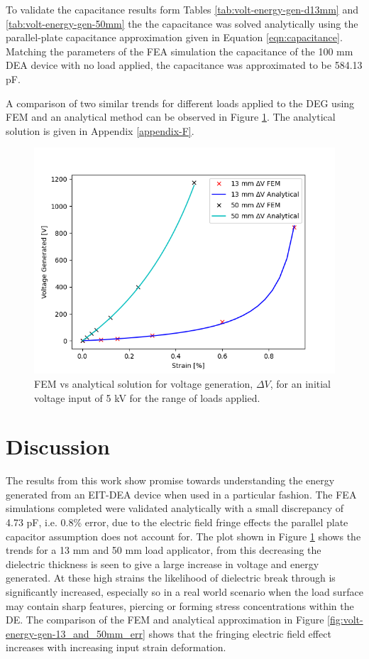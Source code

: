 To validate the capacitance results form Tables \ref{tab:volt-energy-gen-d13mm} and \ref{tab:volt-energy-gen-50mm} the the capacitance was solved analytically using the parallel-plate capacitance approximation given in Equation \ref{eqn:capacitance}. Matching the parameters of the FEA simulation the capacitance of the 100 mm DEA device with no load applied, the capacitance was approximated to be 584.13 pF.

A comparison of two similar trends for different loads applied to the DEG using FEM and an analytical method can be observed in Figure \ref{fig:volt-energy-gen-13_and_50mm}. The analytical solution is given in Appendix \ref{appendix-F}.

\begin{figure}[H]
	\centering
	\includegraphics[width=0.65\linewidth]{Figures/plot_DEG_strain_vs_Vgen_FEM_vs_analytical.png}
	\caption{FEM vs analytical solution for voltage generation, $\Delta V$, for an initial voltage input of 5 kV for the range of loads applied.}
	\label{fig:volt-energy-gen-13_and_50mm}
\end{figure}


\section{Discussion}
\label{sec:discussion}
The results from this work show promise towards understanding the energy generated from an EIT-DEA device when used in a particular fashion. The FEA simulations completed were validated analytically with a small discrepancy of 4.73 pF, i.e. 0.8\% error, due to the electric field fringe effects the parallel plate capacitor assumption does not account for. The plot shown in Figure \ref{fig:volt-energy-gen-13_and_50mm} shows the trends for a 13 mm and 50 mm load applicator, from this decreasing the dielectric thickness is seen to give a large increase in voltage and energy generated. At these high strains the likelihood of dielectric break through is significantly increased, especially so in a real world scenario when the load surface may contain sharp features, piercing or forming stress concentrations within the DE. The comparison of the FEM and analytical approximation in Figure \ref{fig:volt-energy-gen-13_and_50mm_err} shows that the fringing electric field effect increases with increasing input strain deformation.

